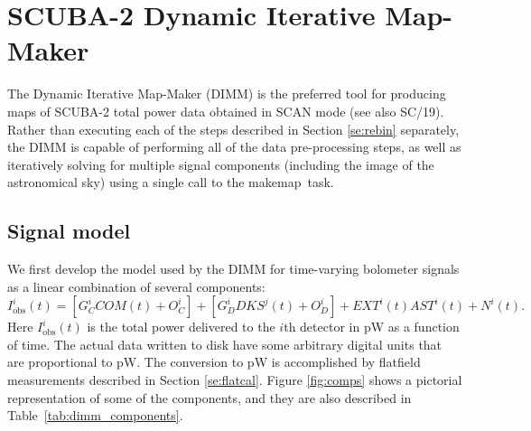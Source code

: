 \documentclass[twoside,11pt]{article}
\newcommand{\xref}[3]{#1}
\newcommand{\xlabel}[1]{}
\renewcommand{\_}{\texttt{\symbol{95}}}
\newcommand{\SMURFcook}{\xref{SC/19}{sc19}{}}
\newcommand{\task}[1]{\textsf{#1}}
\newcommand{\makemap}{\xref{\task{makemap}}{sun258}{MAKEMAP}}
\begin{document}
\section{\xlabel{dimm}SCUBA-2 Dynamic Iterative Map-Maker\label{se:dimm}}

The Dynamic Iterative Map-Maker (DIMM) is the preferred tool for
producing maps of SCUBA-2 total power data obtained in SCAN
mode\cite{sc2ana006} (see also \SMURFcook). Rather than executing each
of the steps described in Section \ref{se:rebin} separately, the DIMM
is capable of performing all of the data pre-processing steps, as well
as iteratively solving for multiple signal components (including the
image of the astronomical sky) using a single call to the \makemap\
task.

\subsection{Signal model}

We first develop the model used by the DIMM for time-varying bolometer
signals as a linear combination of several components:
%
\begin{equation}
I^i_{\mathrm{obs}}(t) = [G_C^i COM(t) + O_C^i] + [G_D^i DKS^j(t) + O_D^i] +
                      EXT^i(t) AST^i(t) + N^i(t).
\end{equation}
%
Here $I^i_{\mathrm{obs}}(t)$ is the total power delivered to the $i$th
detector in pW as a function of time. The actual data written to disk
have some arbitrary digital units that are proportional to pW. The
conversion to pW is accomplished by flatfield measurements described
in Section \ref{se:flatcal}. Figure \ref{fig:comps} shows a pictorial
representation of some of the components, and they are also described
in Table~\ref{tab:dimm_components}.
\end{document}
